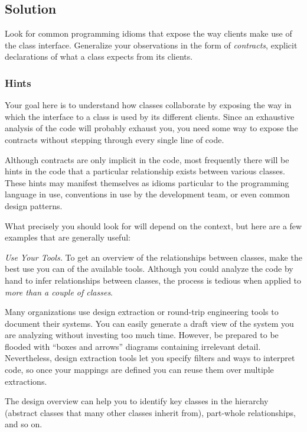 \documentclass[a4paper,10pt,twoside]{book}
\begin{document}
\subsection*{Solution}

Look for common programming idioms that expose the way clients make use of the class interface. Generalize your observations in the form of \emph{contracts}, \ie explicit declarations of what a class expects from its clients.

\subsubsection*{Hints}

Your goal here is to understand how classes collaborate by exposing the way in which the interface to a class is used by its different clients. Since an exhaustive analysis of the code will probably exhaust you, you need some way to expose the contracts without stepping through every single line of code.

Although contracts are only implicit in the code, most frequently there will be hints in the code that a particular relationship exists between various classes. These hints may manifest themselves as idioms particular to the programming language in use, conventions in use by the development team, or even common design patterns. 

What precisely you should look for will depend on the context, but here are a few examples that are generally useful:

\noindent
\emph{Use Your Tools.}
To get an overview of the relationships between classes, make the best use you can of the available tools. Although you could analyze the code by hand to infer relationships between classes, the process is tedious when applied to \emph{more than a couple of classes}.

Many organizations use design extraction or round-trip engineering tools to document their systems. You can easily generate a draft view of the system you are analyzing without investing too much time. However, be prepared to be flooded with ``boxes and arrows'' diagrams containing irrelevant detail. Nevertheless, design extraction tools let you specify filters and ways to interpret code, so once your mappings are defined you can reuse them over multiple extractions.

The design overview can help you to identify key classes in the hierarchy (\ie abstract classes that many other classes inherit from), part-whole relationships, and so on.
\end{document}
